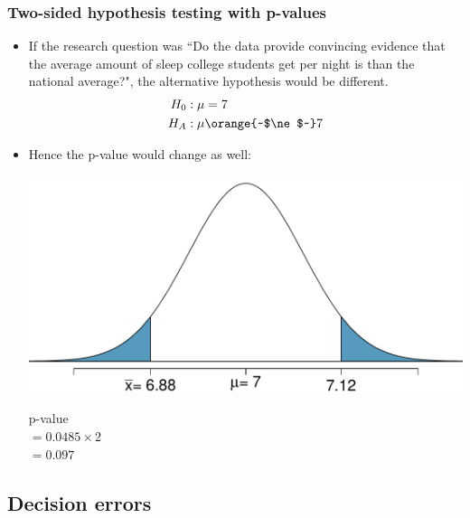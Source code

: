 \begin{frame}
\frametitle{Two-sided hypothesis testing with p-values}

\begin{itemize}

\item If the research question was ``Do the data provide convincing evidence that the average amount of sleep college students get per night is  than the national average?", the alternative hypothesis would be different.
\begin{align*}
H_0&: \mu = 7 \\
H_A&: \mu \orange{~$\ne$~} 7
\end{align*}

\pause

\item Hence the p-value would change as well:
{
\begin{center}
\includegraphics[width=\textwidth]{5-3_hyp_test/figures/sleep/sleep_pval_ts}
\end{center}
}
{
p-value \\
$= 0.0485 \times 2$ \\
$= 0.097$
}

\end{itemize}

\end{frame}


\subsection{Decision errors}


